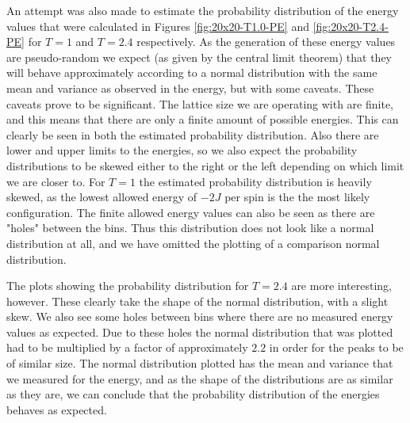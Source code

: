 \documentclass[reprint,english,notitlepage]{revtex4-1}  %
\begin{document}
An attempt was also made to estimate the probability distribution of the energy values that were calculated in Figures \ref{fig:20x20-T1.0-PE} and \ref{fig:20x20-T2.4-PE} for $T=1$ and $T=2.4$ respectively. As the generation of these energy values are pseudo-random we expect (as given by the central limit theorem) that they will behave approximately according to a normal distribution with the same mean and variance as observed in the energy, but with some caveats. These caveats prove to be significant. The lattice size we are operating with are finite, and this means that there are only a finite amount of possible energies. This can clearly be seen in both the estimated probability distribution. Also there are lower and upper limits to the energies, so we also expect the probability distributions to be skewed either to the right or the left depending on which limit we are closer to. For $T=1$ the estimated probability distribution is heavily skewed, as the lowest allowed energy of $-2J$ per spin is the the most likely configuration. The finite allowed energy values can also be seen as there are "holes" between the bins. Thus this distribution does not look like a normal distribution at all, and we have omitted the plotting of a comparison normal distribution. 

The plots showing the probability distribution for $T=2.4$ are more interesting, however. These clearly take the shape of the normal distribution, with a slight skew. We also see some holes between bins where there are no measured energy values as expected. Due to these holes the normal distribution that was plotted had to be multiplied by a factor of approximately $2.2$ in order for the peaks to be of similar size. The normal distribution plotted has the mean and variance that we measured for the energy, and as the shape of the distributions are as similar as they are, we can conclude that the probability distribution of the energies behaves as expected.
\end{document}
